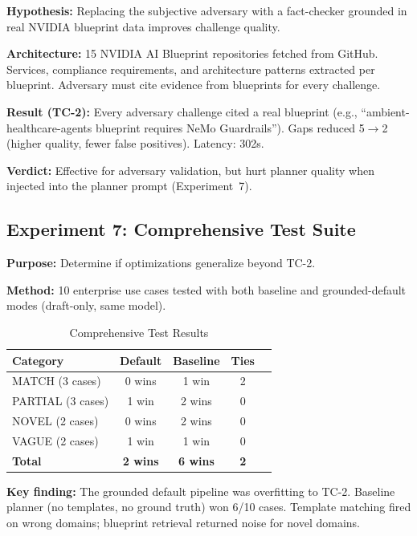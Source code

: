 \documentclass[conference]{IEEEtran}
\begin{document}
\textbf{Hypothesis:} Replacing the subjective adversary with a fact-checker grounded in real NVIDIA blueprint data improves challenge quality.

\textbf{Architecture:} 15 NVIDIA AI Blueprint repositories fetched from GitHub. Services, compliance requirements, and architecture patterns extracted per blueprint. Adversary must cite evidence from blueprints for every challenge.

\textbf{Result (TC-2):} Every adversary challenge cited a real blueprint (e.g., ``ambient-healthcare-agents blueprint requires NeMo Guardrails''). Gaps reduced 5$\rightarrow$2 (higher quality, fewer false positives). Latency: 302s.

\textbf{Verdict:} Effective for adversary validation, but hurt planner quality when injected into the planner prompt (Experiment~7).

\subsection{Experiment 7: Comprehensive Test Suite}

\textbf{Purpose:} Determine if optimizations generalize beyond TC-2.

\textbf{Method:} 10 enterprise use cases tested with both baseline and grounded-default modes (draft-only, same model).

\begin{table}[h]
\centering
\caption{Comprehensive Test Results}
\label{tab:comprehensive}
\begin{tabular}{@{}lcccc@{}}
\toprule
\textbf{Category} & \textbf{Default} & \textbf{Baseline} & \textbf{Ties} \\
\midrule
MATCH (3 cases) & 0 wins & 1 win & 2 \\
PARTIAL (3 cases) & 1 win & 2 wins & 0 \\
NOVEL (2 cases) & 0 wins & 2 wins & 0 \\
VAGUE (2 cases) & 1 win & 1 win & 0 \\
\midrule
\textbf{Total} & \textbf{2 wins} & \textbf{6 wins} & \textbf{2} \\
\bottomrule
\end{tabular}
\end{table}

\textbf{Key finding:} The grounded default pipeline was overfitting to TC-2. Baseline planner (no templates, no ground truth) won 6/10 cases. Template matching fired on wrong domains; blueprint retrieval returned noise for novel domains.
\end{document}

